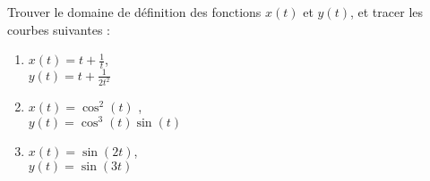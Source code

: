 \begin{exercice}[\minsyndical]\label{exoCourbesSurfaces0002}






		


Trouver le domaine de définition des fonctions $x(t)$ et $y(t)$, et tracer les courbes suivantes :
	\begin{enumerate}
		\item		\label{CourbSDi}
$\displaystyle x (t) =t + \frac{1}{t}$, \\   $y (t) = t + \frac{1}{2t^2}$
\item\label{CourbSDii}
$\displaystyle x (t) = \cos^{2} (t)$ ,\\  $y (t) = \cos^{3} (t)\sin (t)$
\item\label{CourbSDvii}
$\displaystyle x (t) = \sin (2t)$,  \\ $y (t) = \sin (3t)$
	\end{enumerate}
\end{exercice}
